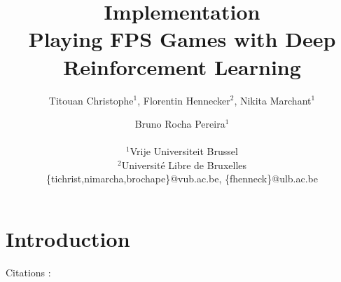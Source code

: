 \documentclass[letterpaper]{article}
\title{Implementation\\Playing FPS Games with Deep Reinforcement Learning}
\author{Titouan Christophe$^{1}$, Florentin Hennecker$^{2}$, Nikita Marchant$^{1}$ \and Bruno Rocha Pereira$^{1}$ \\
\mbox{}\\
$^1$Vrije Universiteit Brussel \\
$^2$Universit\'e Libre de Bruxelles \\
\{tichrist,nimarcha,brochape\}@vub.ac.be, \{fhenneck\}@ulb.ac.be}
\begin{document}
\maketitle

\begin{abstract}
\end{abstract}

\section{Introduction}

Citations :\citep{CA2}
\footnotesize


\end{document}
